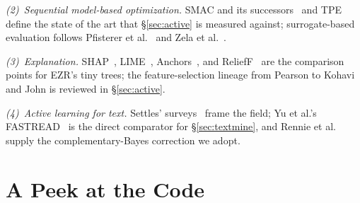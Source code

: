 \documentclass[AMA,STIX2COL]{WileyNJDv5}
\newcommand{\IT}{{\sffamily EZR}}
\begin{document}
{\em (2)~Sequential model-based optimization.} SMAC and its
successors~\cite{hutter2011sequential,lindauer2022smac3} and
TPE~\cite{bergstra2011tpe} define the state of the art that
\S\ref{sec:active} is measured against; surrogate-based
evaluation follows Pfisterer et al.~\cite{pfisterer2022yahpo}
and Zela et al.~\cite{zela2020surrogate}.

{\em (3)~Explanation.} SHAP~\cite{lundberg2017unified},
LIME~\cite{ribeiro2016should}, Anchors~\cite{ribeiro2018anchors},
and ReliefF~\cite{robnik1997adaptation} are the comparison points
for \IT{}'s tiny trees; the feature-selection lineage from
Pearson to Kohavi and John is reviewed in \S\ref{sec:active}.

{\em (4)~Active learning for text.} Settles'
surveys~\cite{settles2008analysis,settles2009active} frame the
field; Yu et al.'s FASTREAD~\cite{yu2018total,yu2018finding} is
the direct comparator for \S\ref{sec:textmine}, and Rennie et
al.~\cite{rennie2003tackling} supply the complementary-Bayes
correction we adopt.



\section{A Peek at the Code}\label{sec:peek}
\end{document}
